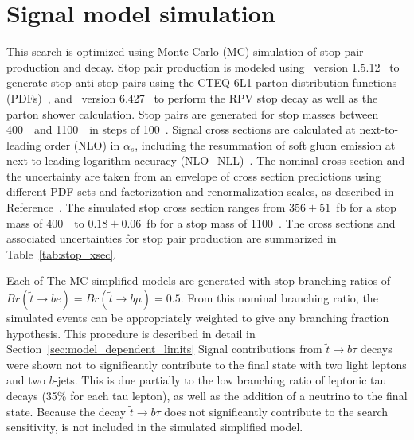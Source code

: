 
\FloatBarrier
\section{Signal model simulation}
\label{sec:signal_model_mc}

This search is optimized using Monte Carlo (MC) simulation of stop pair
production and decay.
Stop pair production is modeled using \madgraph\ version
1.5.12~\cite{Alwall:2011uj} to generate stop-anti-stop pairs using the
CTEQ 6L1 parton distribution functions (PDFs)~\cite{Nadolsky:2008zw},
and \pythia\ version 6.427~\cite{Sjostrand:2006za} to perform the
RPV stop decay as well as the parton shower calculation.
Stop pairs are generated for stop masses between 400~\GeV\ and 1100~\GeV\ in
steps of 100~\GeV.
Signal cross sections are calculated at next-to-leading order (NLO) in
$\alpha_s$, including the resummation of soft gluon emission at
next-to-leading-logarithm accuracy
(NLO+NLL)~\cite{Beenakker:1997ut,Beenakker:2010nq,Beenakker:2011fu}.
The nominal cross section and the uncertainty are taken from an envelope of
cross section predictions using different PDF sets and factorization and
renormalization scales, as described in Reference~\cite{Kramer:2012bx}.
The simulated stop cross section ranges from $356 \pm 51$~fb for a stop mass
of 400~\GeV\ to $0.18 \pm 0.06$~fb for a stop mass of 1100~\GeV.
The cross sections and associated uncertainties for stop pair production are
summarized in Table~\ref{tab:stop_xsec}.

Each of The MC simplified models are generated with stop branching ratios of 
$Br(\tilde{t} \rightarrow be) = Br(\tilde{t} \rightarrow b\mu) = 0.5$.
From this nominal branching ratio, the simulated events can be appropriately
weighted to give any branching fraction hypothesis.
This procedure is described in detail in
Section~\ref{sec:model_dependent_limits}
Signal contributions from $\tilde{t} \rightarrow b\tau$ decays were shown not
to significantly contribute to the final state with two light leptons and two
$b$-jets.
This is due partially to the low branching ratio of leptonic tau decays (35\%
for each tau lepton), as well as the addition of a neutrino to the final state.
Because the decay $\tilde{t} \rightarrow b\tau$ does not significantly
contribute to the search sensitivity, is not included in the simulated
simplified model.

